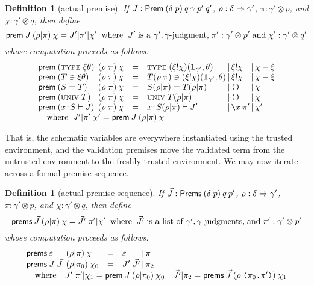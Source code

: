 \documentclass{jfp1}
\newtheorem{definition}[theorem]{Definition}
\newcommand{\emp}{\varepsilon}
\newcommand{\Pa}[1]{\texttt{(}#1\texttt{)}}
\newcommand{\dt}{\texttt{.}}
\newcommand{\cn}[2]{\Pa{#1 \dt #2}}
\newcommand{\Se}{\mathsf}
\begin{document}
\newcommand{\prem}[4]{\Se{prem}\:#1\:\ssc{#2}{#3}\:#4}
\newcommand{\prems}[4]{\Se{prems}\:#1\:\ssc{#2}{#3}\:#4}
\begin{definition}[actual premise]
  If $J : \Prem{\ssc\delta p}q\gamma{p'}{q'}$, $\rho : \delta\Rightarrow\gamma'$,
  $\pi : \gamma'\otimes
  p$, and $\chi : \gamma'\otimes q$, then define
  \[\prem J\rho\pi\chi = J'|\pi'|\chi'\;\;\mbox{where}\;\;
    J'\;\mbox{is a $\gamma',\gamma$-judgment,}\;
    \pi' : \gamma'\otimes p'\;\mbox{and}\; \chi':\gamma'\otimes q'
  \]
  whose computation proceeds as follows:
  \[\begin{array}{l@{\:}lcl@{\,|\,}l@{\,|\,}l}
      \prem{(\ty{\xi\theta})&}\rho\pi\chi & =
      & \ty{(\sel\xi\chi)(\ith_{\gamma'},\theta)}
      & \sel\xi\chi & \chi-\xi \\
      \prem{(\chk T{\xi\theta})&}\rho\pi\chi & =
      & \chk{T\ssc\rho\pi}{(\sel\xi\chi)(\ith_{\gamma'},\theta)}
      & \sel\xi\chi & \chi-\xi \\
      \prem{(S=T)&}\rho\pi\chi & =
      & S\ssc\rho\pi=T\ssc\rho\pi & \Pa{} & \chi \\
      \prem{(\univ T)&}\rho\pi\chi & =
      & \univ{T\ssc\rho\pi} & \Pa{} & \chi \\
      \prem{(\cxe xS J)&}\rho\pi\chi & =
      & \cxe x{S\ssc\rho\pi}J' & \la x\pi' & \chi'\\
      \multicolumn{6}{l}{\quad  \mbox{where} \;\;J'|\pi'|\chi' = \prem J\rho\pi\chi}
  \end{array}\]
\end{definition}

That is, the schematic variables are everywhere instantiated using the
trusted environment, and the validation premises move the validated
term from the untrusted environment to the freshly trusted
environment. We may now iterate across a formal premise sequence.

\begin{definition}[actual premise sequence]
  If $\vec J : \Prems{\ssc\delta p}q{p'}$,  $\rho : \delta\Rightarrow\gamma'$,
  $\pi : \gamma'\otimes p$, and $\chi : \gamma'\otimes q$, then define
  \[\prems{\vec J}\rho\pi\chi = \vec{J'}|\pi'|\chi'\;\;\mbox{where}\;\;
    \vec{J'}\;\mbox{is a list of $\gamma',\gamma$-judgments,}\;\mbox{and}\;
    \pi' : \gamma'\otimes p'
  \]
  whose computation proceeds as follows.
  \[\begin{array}{l@{\:}lcl@{\,|\,}l}
      \prems{\emp&}\rho\pi\chi & = & \emp & \pi \\
      \prems{J\;\vec J&}\rho{\pi_0}{\chi_0} & = & J'\;\vec{J'} & \pi_2
      \\
      \multicolumn{5}{l}{\quad \mbox{where}\quad
      J'|\pi'|\chi_1 = \prem J\rho{\pi_0}{\chi_0}\quad
      \vec{J'}|\pi_2 = \prems{\vec J}\rho{\cn{\pi_0}{\pi'}}{\chi_1}
      }
  \end{array}\]
\end{definition}
\end{document}

